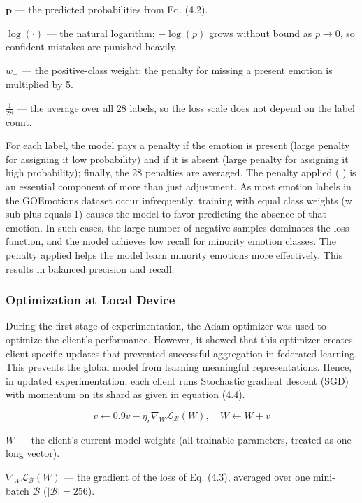 $\mathbf{p}$ --- the predicted probabilities from Eq. (4.2).

$\log(\cdot)$ --- the natural logarithm; $-\log(p)$ grows without bound as $p \to 0$, so confident mistakes are punished heavily.

$w_{+}$ --- the positive-class weight: the penalty for missing a present emotion is multiplied by 5.

$\frac{1}{28}$ --- the average over all 28 labels, so the loss scale does not depend on the label count.

For each label, the model pays a penalty  if the emotion is present (large penalty for assigning it low probability) and  if it is absent (large penalty for assigning it high probability); finally, the 28 penalties are averaged. The penalty applied (  ) is an essential component of more than just adjustment. As most emotion labels in the GOEmotions dataset occur infrequently, training with equal class weights (w sub plus equals 1) causes the model to favor predicting the absence of that emotion. In such cases, the large number of negative samples dominates the loss function, and the model achieves low recall for minority emotion classes. The penalty applied helps the model learn minority emotions more effectively. This results in balanced precision and recall.

\subsubsection{Optimization at Local Device}
During the first stage of experimentation, the Adam optimizer was used to optimize the client’s performance. However, it showed that this optimizer creates client-specific updates that prevented successful aggregation in federated learning. This prevents the global model from learning meaningful representations. Hence, in updated experimentation, each client runs Stochastic gradient descent (SGD) with momentum on its shard as given in equation (4.4).

\begin{equation}
  v \leftarrow 0.9v - \eta_{r} \nabla_{W} \mathcal{L}_{\mathcal{B}}(W), \quad W \leftarrow W + v
  \label{eq:ch4_4_4}
\end{equation}

$W$ --- the client’s current model weights (all trainable parameters, treated as one long vector).

$\nabla_{W} \mathcal{L}_{\mathcal{B}}(W)$ --- the gradient of the loss of Eq. (4.3), averaged over one mini-batch $\mathcal{B}$ ($|\mathcal{B}| = 256$).

